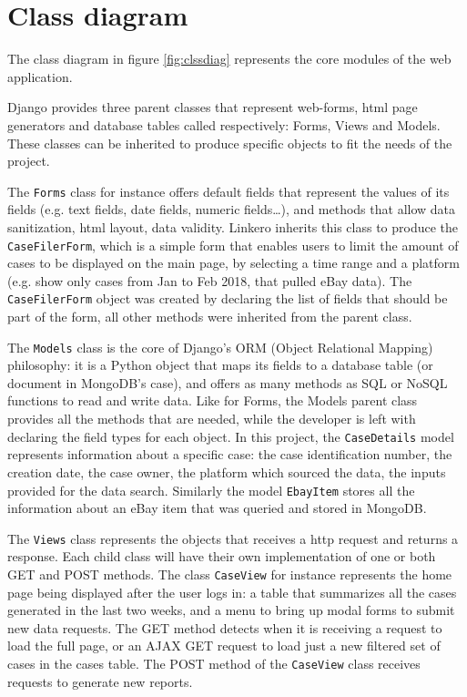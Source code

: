 \section{Class diagram}
The class diagram in figure \ref{fig:clssdiag} represents the core modules of
the web application.

Django provides three parent classes that represent web-forms, html page
generators and database tables called respectively: Forms, Views and Models.
These classes can be inherited to produce specific objects to fit the needs of
the project.

The \texttt{Forms} class for instance offers default fields that represent the
values of its fields (e.g. text fields, date fields, numeric fields\ldots), and methods
that allow data sanitization, html layout, data validity. Linkero inherits this
class to produce the \texttt{CaseFilerForm}, which is a simple form that enables
users to limit the amount of cases to be displayed on the main page, by
selecting a time range and a platform (e.g. show only cases from Jan to Feb
2018, that pulled eBay data). The \texttt{CaseFilerForm} object was created by declaring
the list of fields that should be part of the form, all other methods were
inherited from the parent class.

The \texttt{Models} class is the core of Django's ORM (Object Relational Mapping)
philosophy: it is a Python object that maps its fields to a database table (or
document in MongoDB's case), and offers as many methods as SQL or NoSQL
functions to read and write data. Like for Forms, the Models parent class
provides all the methods that are needed, while the developer is left with
declaring the field types for each object. In this project, the
\texttt{CaseDetails} model represents information about a specific case: the
case identification number, the creation date, the case owner, the platform which
sourced the data, the inputs provided for the data search. Similarly the model
\texttt{EbayItem} stores all the information about an eBay item that was queried
and stored in MongoDB.

The \texttt{Views} class represents the objects that receives a http request and
returns a response. Each child class will have their own implementation of one
or both GET and POST methods. The class \texttt{CaseView} for instance represents the
home page being displayed after the user logs in: a table that summarizes all
the cases generated in the last two weeks, and a menu to bring up modal forms to
submit new data requests. The GET method detects when it is receiving a
request to load the full page, or an AJAX GET request to load just a new
filtered set of cases in the cases table. The POST method of the
\texttt{CaseView} class receives requests to generate new reports.

